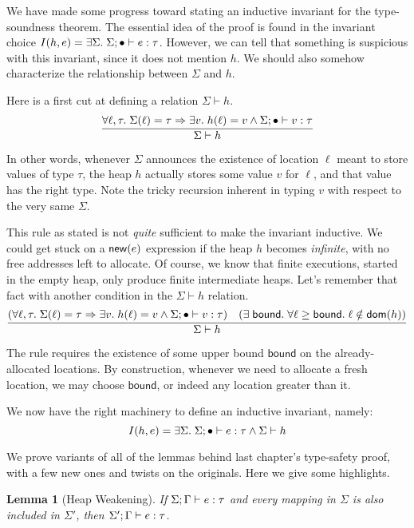 \documentclass{amsbook}
\newtheorem{lemma}[theorem]{Lemma}
\theoremstyle{definition}
\theoremstyle{remark}
\numberwithin{section}{chapter}
\numberwithin{equation}{chapter}
\begin{document}
We have made some progress toward stating an inductive invariant for the type-soundness theorem.
The essential idea of the proof is found in the invariant choice $I(h, e) = \exists \Sigma. \; \Sigma; \bullet \vdash e : \tau$.
However, we can tell that something is suspicious with this invariant, since it does not mention $h$.
We should also somehow characterize the relationship between $\Sigma$ and $h$.

\newcommand{\heapty}[2]{#1 \vdash #2}

Here is a first cut at defining a relation $\heapty{\Sigma}{h}$.
$$\infer{\heapty{\Sigma}{h}}{
  \forall \ell, \tau. \; \msel{\Sigma}{\ell} = \tau \Rightarrow \exists v. \; \msel{h}{\ell} = v \land \rhasty{\Sigma}{\mempty}{v}{\tau}
}$$

In other words, whenever $\Sigma$ announces the existence of location $\ell$ meant to store values of type $\tau$, the heap $h$ actually stores some value $v$ for $\ell$, and that value has the right type.
Note the tricky recursion inherent in typing $v$ with respect to the very same $\Sigma$.

This rule as stated is not \emph{quite} sufficient to make the invariant inductive.
We could get stuck on a $\mathsf{new}(e)$ expression if the heap $h$ becomes \emph{infinite}, with no free addresses left to allocate.
Of course, we know that finite executions, started in the empty heap, only produce finite intermediate heaps.
Let's remember that fact with another condition in the $\heapty{\Sigma}{h}$ relation.
$$\infer{\heapty{\Sigma}{h}}{
  (\forall \ell, \tau. \; \msel{\Sigma}{\ell} = \tau \Rightarrow \exists v. \; \msel{h}{\ell} = v \land \rhasty{\Sigma}{\mempty}{v}{\tau})
  & (\exists \; \mathsf{bound}. \; \forall \ell \geq \mathsf{bound}. \; \ell \notin \dom{h})
}$$

The rule requires the existence of some upper bound $\mathsf{bound}$ on the already-allocated locations.
By construction, whenever we need to allocate a fresh location, we may choose $\mathsf{bound}$, or indeed any location greater than it.

We now have the right machinery to define an inductive invariant, namely:
\invariants
$$I(h, e) = \exists \Sigma. \; \rhasty{\Sigma}{\mempty}{e}{\tau} \land \heapty{\Sigma}{h}$$

We prove variants of all of the lemmas behind last chapter's type-safety proof, with a few new ones and twists on the originals.
Here we give some highlights.

\begin{lemma}[Heap Weakening]
  If $\Sigma; \Gamma \vdash e : \tau$ and every mapping in $\Sigma$ is also included in $\Sigma'$, then $\Sigma'; \Gamma \vdash e : \tau$.
\end{lemma}
\end{document}
